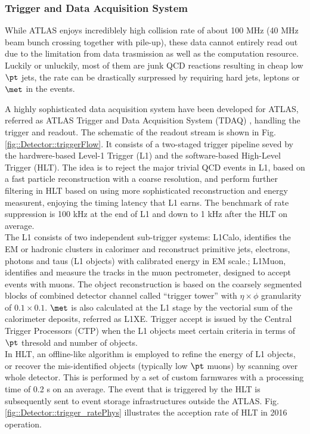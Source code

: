 \subsubsection{Trigger and Data Acquisition System}
While ATLAS enjoys incrediblely high collision rate of about 100 MHz (40 MHz beam bunch crossing together with pile-up),
these data cannot entirely read out due to the limitation from data trasmission as well as the computation resource.
Luckily or unluckily, most of them are junk QCD reactions resulting in cheap low $\pt$ jets, 
the rate can be drastically surpressed by requiring hard jets, leptons or $\met$ in the events.

A highly sophisticated data acquisition system have been developed for ATLAS, referred as ATLAS Trigger and Data Acquisition System (TDAQ) \cite{trigger2015}, handling the trigger and readout. The schematic of the readout stream is shown in Fig. \ref{fig::Detector::triggerFlow}.
It consists of a two-staged trigger pipeline seved by the hardwere-based Level-1 Trigger (L1) and the software-based High-Level Trigger (HLT).
The idea is to reject the major trivial QCD events in L1, based on a fast particle reconstruction with a coarse resolution, and perform further filtering in HLT based on using more sophisticated reconstruction and energy measurent, enjoying the timing latency that L1 earns. The benchmark of rate suppression is 100 kHz at the end of L1 and down to 1 kHz after the HLT on average. \\
The L1 consists of two independent sub-trigger systems: L1Calo, identifies the EM or hadronic clusters in calorimer and reconstruct primitive jets, electrons, photons and taus (L1 objects) with calibrated energy in EM scale.; L1Muon, identifies and measure the tracks in the muon pectrometer, designed to accept events with muons. 
The object reconstruction is based on the coarsely segmented blocks of combined detector channel called ``trigger tower'' with $\eta\times\phi$ granularity of $0.1 \times 0.1$. 
$\met$ is also calculated at the L1 stage by the vectorial sum of the calorimeter deposits, referred as L1XE. Trigger accept is issued by the Central Trigger Processors (CTP) when the L1 objects meet certain criteria in terms of $\pt$ thresold and number of objects.  \\

In HLT, an offline-like algorithm is employed to refine the energy of L1 objects, or recover the mis-identified objects (typically low $\pt$ muons) by scanning over whole detector. This is performed by a set of custom farmwares with a processing time of 0.2 s on an average. The event that is triggered by the HLT is subsequently sent to event storage infrastructures outside the ATLAS. 
Fig. \ref{fig::Detector::trigger_ratePhys} illustrates the acception rate of HLT in 2016 operation. \\

